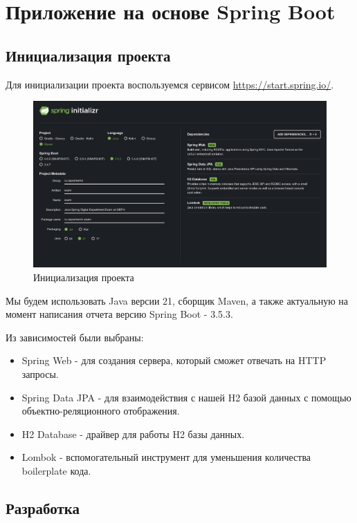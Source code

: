 \documentclass[a4paper, 14pt]{article}
\begin{document}
\newpage
\section{Приложение на основе Spring Boot}

\subsection{Инициализация проекта}

Для инициализации проекта воспользуемся сервисом \url{https://start.spring.io/}.

\begin{figure}[H]
	\centering
	\includegraphics[width=17cm]{resources/1.png}
	\caption{Инициализация проекта}
\end{figure}

Мы будем использовать Java версии 21, сборщик Maven, а также актуальную на момент написания отчета версию Spring Boot - 3.5.3.


Из зависимостей были выбраны:

\begin{itemize}
	\item Spring Web - для создания сервера, который сможет отвечать на HTTP запросы.
	\item Spring Data JPA - для взаимодействия с нашей H2 базой данных с помощью объектно-реляционного отображения.
	\item H2 Database - драйвер для работы H2 базы данных.
	\item Lombok - вспомогательный инструмент для уменьшения количества boilerplate кода.
\end{itemize}

\subsection{Разработка}
\end{document}
